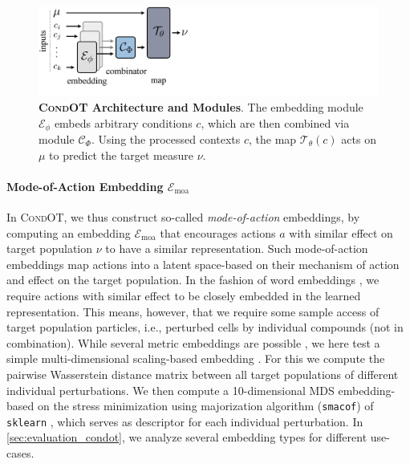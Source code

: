 \begin{figure}
    \centering
    \includegraphics[width=\textwidth]{figures/fig_architecture.pdf}
    \caption{\textbf{\textsc{CondOT} Architecture and Modules}. The embedding module $\mathcal{E}_\phi$ embeds arbitrary conditions $c$, which are then combined via module $\mathcal{C}_\Phi$. Using the processed contexts $c$, the map $\mathcal{T}_\theta(c)$ acts on $\mu$ to predict the target measure $\nu$. \vspace{-10pt}}
    \label{fig:architecture}
\end{figure}
\paragraph{Mode-of-Action Embedding $\mathcal{E}_\text{moa}$}
In \textsc{CondOT}, we thus construct so-called \emph{mode-of-action} embeddings, by computing an embedding $\mathcal{E}_\text{moa}$ that encourages actions $a$ with similar effect on target population $\nu$ to have a similar representation.
Such mode-of-action embeddings map actions into a latent space-based on their mechanism of action and effect on the target population.
In the fashion of word embeddings \citep{mikolov2013efficient, mikolov2013distributed, mikolov2013linguistic}, we require actions with similar effect to be closely embedded in the learned representation.
This means, however, that we require some sample access of target population particles, i.e., perturbed cells by individual compounds (not in combination).
While several metric embeddings are possible \citep{chopra2005learning}, we here test a simple multi-dimensional scaling-based embedding \citep{mead1992review}.
For this we compute the pairwise Wasserstein distance matrix between all target populations of different individual perturbations. We then compute a 10-dimensional MDS embedding-based on the stress minimization using majorization algorithm (\texttt{smacof}) \citep{de2009multidimensional} of \texttt{sklearn} \citep{pedregosa2011scikit}, which serves as descriptor for each individual perturbation.
In \cref{sec:evaluation_condot}, we analyze several embedding types for different use-cases.

